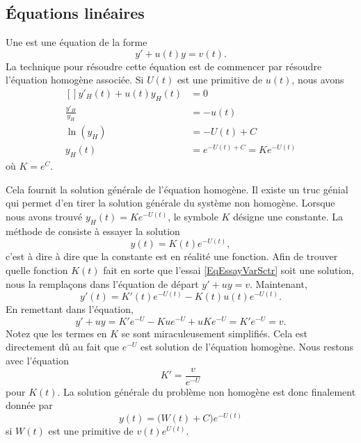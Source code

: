 					\subsection{Équations linéaires}

Une  est une équation de la forme
\begin{equation}
	y'+u(t)y=v(t).
\end{equation}
La technique pour résoudre cette équation est de commencer par résoudre l'équation homogène associée. Si $U(t)$ est une primitive de $u(t)$, nous avons
\begin{equation}
	\begin{aligned}[]
		y'_H(t)+u(t)y_H(t)&=0\\
		\frac{ y'_H }{ y_H }&=-u(t)\\
		\ln(y_H)&=-U(t)+C\\
		y_H(t)&= e^{-U(t)+C}=K e^{-U(t)}
	\end{aligned}
\end{equation}
où $K= e^{C}$.

Cela fournit la solution générale de l'équation homogène. Il existe un truc génial qui permet d'en tirer la solution générale du système non homogène. Lorsque nous avons trouvé $y_H(t)=K e^{-U(t)}$, le symbole $K$ désigne une constante. La méthode de  consiste à essayer la solution
\begin{equation}		\label{EqEssayVarSctr}
	y(t)=K(t) e^{-U(t)},
\end{equation}
c'est à dire à dire que la constante est en réalité une fonction. Afin de trouver quelle fonction $K(t)$ fait en sorte que l'essai \eqref{EqEssayVarSctr} soit une solution, nous la remplaçons dans l'équation de départ $y'+uy=v$. Maintenant,
\begin{equation}
	y'(t)=K'(t) e^{-U(t)}-K(t)u(t) e^{-U(t)}.
\end{equation}
En remettant dans l'équation,
\begin{equation}
	y'+uy=K' e^{-U}-Ku e^{-U}+uK e^{-U}=K' e^{-U}=v.
\end{equation}
Notez que les termes en $K$ se sont miraculeusement simplifiés. Cela est directement dû au fait que $ e^{-U}$ est solution de l'équation homogène. Nous restons avec l'équation
\begin{equation}
	K'=\frac{ v }{  e^{-U} }
\end{equation}
pour $K(t)$. La solution générale du problème non homogène est donc finalement donnée par
\begin{equation}
	y(t)=\big( W(t)+C \big) e^{-U(t)}
\end{equation}
si $W(t)$ est une primitive de $v(t)e^{U(t)}$.

